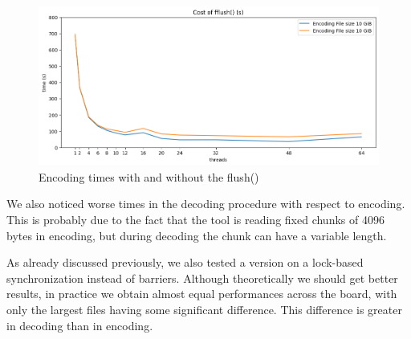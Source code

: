 \begin{figure}
	\centering
	\includegraphics[width=1\linewidth]{"../imgs/Flush vs non Flush"}
	\caption{Encoding times with and without the flush()}
	\label{fig:flush-vs-non-flush}
\end{figure}

We also noticed worse times in the decoding procedure with respect to encoding. This is probably due to the fact that the tool is reading fixed chunks of 4096 bytes in encoding, but during decoding the chunk can have a variable length.


As already discussed previously, we also tested a version on a lock-based synchronization instead of barriers. Although theoretically we should get better results, in practice we obtain almost equal performances across the board, with only the largest files having some significant difference. This difference is greater in decoding than in encoding.

